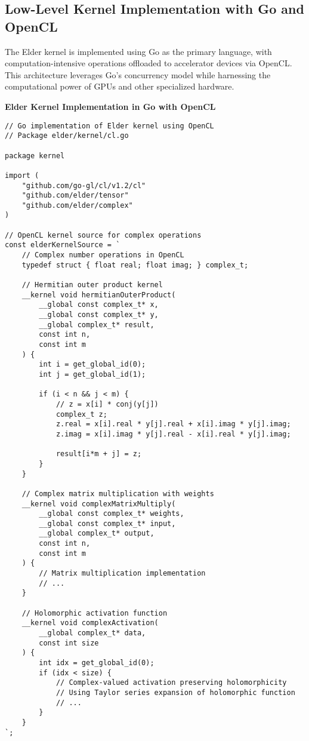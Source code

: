 \subsection{Low-Level Kernel Implementation with Go and OpenCL}

The Elder kernel is implemented using Go as the primary language, with computation-intensive operations offloaded to accelerator devices via OpenCL. This architecture leverages Go's concurrency model while harnessing the computational power of GPUs and other specialized hardware.

\begin{center}
\textbf{Elder Kernel Implementation in Go with OpenCL}
\end{center}

\begin{verbatim}
// Go implementation of Elder kernel using OpenCL
// Package elder/kernel/cl.go

package kernel

import (
    "github.com/go-gl/cl/v1.2/cl"
    "github.com/elder/tensor"
    "github.com/elder/complex"
)

// OpenCL kernel source for complex operations
const elderKernelSource = `
    // Complex number operations in OpenCL
    typedef struct { float real; float imag; } complex_t;
    
    // Hermitian outer product kernel
    __kernel void hermitianOuterProduct(
        __global const complex_t* x,
        __global const complex_t* y,
        __global complex_t* result,
        const int n,
        const int m
    ) {
        int i = get_global_id(0);
        int j = get_global_id(1);
        
        if (i < n && j < m) {
            // z = x[i] * conj(y[j])
            complex_t z;
            z.real = x[i].real * y[j].real + x[i].imag * y[j].imag;
            z.imag = x[i].imag * y[j].real - x[i].real * y[j].imag;
            
            result[i*m + j] = z;
        }
    }
    
    // Complex matrix multiplication with weights
    __kernel void complexMatrixMultiply(
        __global const complex_t* weights,
        __global const complex_t* input,
        __global complex_t* output,
        const int n,
        const int m
    ) {
        // Matrix multiplication implementation
        // ...
    }
    
    // Holomorphic activation function
    __kernel void complexActivation(
        __global complex_t* data,
        const int size
    ) {
        int idx = get_global_id(0);
        if (idx < size) {
            // Complex-valued activation preserving holomorphicity
            // Using Taylor series expansion of holomorphic function
            // ...
        }
    }
`;


\end{verbatim}
